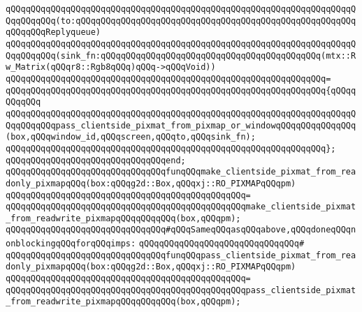 \verb|qQQqqQQqqQQqqQQqqQQqqQQqqQQqqQQqqQQqqQQqqQQqqQQqqQQqqQQqqQQqqQQqqQQqqQQqqQQqqQQq(to:qQQqqQQqqQQqqQQqqQQqqQQqqQQqqQQqqQQqqQQqqQQqqQQqqQQqqQQqqQQqqQQqReplyqueue)|\newline
\verb|qQQqqQQqqQQqqQQqqQQqqQQqqQQqqQQqqQQqqQQqqQQqqQQqqQQqqQQqqQQqqQQqqQQqqQQqqQQqqQQq(sink_fn:qQQqqQQqqQQqqQQqqQQqqQQqqQQqqQQqqQQqqQQqqQQq(mtx::Rw_Matrix(qQQqr8::Rgb8qQQq)qQQq->qQQqVoid))|\newline
\verb|qQQqqQQqqQQqqQQqqQQqqQQqqQQqqQQqqQQqqQQqqQQqqQQqqQQqqQQqqQQqqQQq=|\newline
\verb|qQQqqQQqqQQqqQQqqQQqqQQqqQQqqQQqqQQqqQQqqQQqqQQqqQQqqQQqqQQqqQQq{qQQqqQQqqQQq|\newline
\verb|qQQqqQQqqQQqqQQqqQQqqQQqqQQqqQQqqQQqqQQqqQQqqQQqqQQqqQQqqQQqqQQqqQQqqQQqqQQqqQQqpass_clientside_pixmat_from_pixmap_or_windowqQQqqQQqqQQqqQQq(box,qQQqwindow_id,qQQqscreen,qQQqto,qQQqsink_fn);|\newline
\verb|qQQqqQQqqQQqqQQqqQQqqQQqqQQqqQQqqQQqqQQqqQQqqQQqqQQqqQQqqQQqqQQq};|\newline
\verb|qQQqqQQqqQQqqQQqqQQqqQQqqQQqqQQqend;|\newline
\newline
\newline
\newline
\verb|qQQqqQQqqQQqqQQqqQQqqQQqqQQqqQQqfunqQQqmake_clientside_pixmat_from_readonly_pixmapqQQq(box:qQQqg2d::Box,qQQqxj::RO_PIXMAPqQQqpm)|\newline
\verb|qQQqqQQqqQQqqQQqqQQqqQQqqQQqqQQqqQQqqQQqqQQqqQQq=|\newline
\verb|qQQqqQQqqQQqqQQqqQQqqQQqqQQqqQQqqQQqqQQqqQQqqQQqmake_clientside_pixmat_from_readwrite_pixmapqQQqqQQqqQQq(box,qQQqpm);|\newline
\newline
\verb|qQQqqQQqqQQqqQQqqQQqqQQqqQQqqQQq#qQQqSameqQQqasqQQqabove,qQQqdoneqQQqnonblockingqQQqforqQQqimps:|\newline
\verb|qQQqqQQqqQQqqQQqqQQqqQQqqQQqqQQq#|\newline
\verb|qQQqqQQqqQQqqQQqqQQqqQQqqQQqqQQqfunqQQqpass_clientside_pixmat_from_readonly_pixmapqQQq(box:qQQqg2d::Box,qQQqxj::RO_PIXMAPqQQqpm)|\newline
\verb|qQQqqQQqqQQqqQQqqQQqqQQqqQQqqQQqqQQqqQQqqQQqqQQq=|\newline
\verb|qQQqqQQqqQQqqQQqqQQqqQQqqQQqqQQqqQQqqQQqqQQqqQQqpass_clientside_pixmat_from_readwrite_pixmapqQQqqQQqqQQq(box,qQQqpm);|\newline
\newline
\newline
